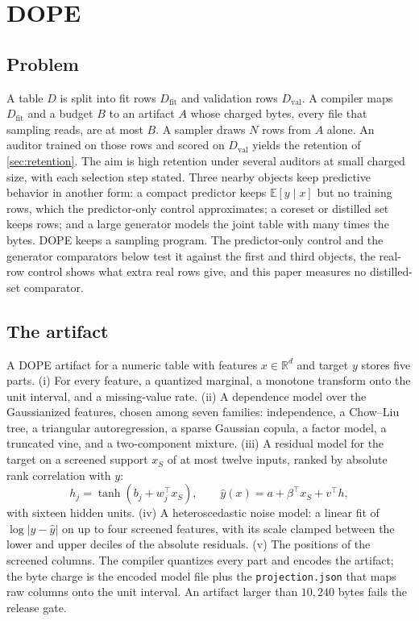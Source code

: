 \documentclass{article} %
\begin{document}
\section{DOPE}
\label{sec:method}
\subsection{Problem}
\label{sec:problem}
A table $D$ is split into fit rows $D_{\mathrm{fit}}$ and validation rows $D_{\mathrm{val}}$. A compiler maps $D_{\mathrm{fit}}$ and a budget $B$ to an artifact $A$ whose charged bytes, every file that sampling reads, are at most $B$. A sampler draws $N$ rows from $A$ alone. An auditor trained on those rows and scored on $D_{\mathrm{val}}$ yields the retention of \cref{sec:retention}. The aim is high retention under several auditors at small charged size, with each selection step stated. Three nearby objects keep predictive behavior in another form: a compact predictor keeps $\mathbb{E}[y\mid x]$ but no training rows, which the predictor-only control approximates; a coreset or distilled set keeps rows; and a large generator models the joint table with many times the bytes. DOPE keeps a sampling program. The predictor-only control and the generator comparators below test it against the first and third objects, the real-row control shows what extra real rows give, and this paper measures no distilled-set comparator.

\subsection{The artifact}
\label{sec:artifact}
A DOPE artifact for a numeric table with features $x\in\mathbb{R}^d$ and target $y$ stores five parts. (i) For every feature, a quantized marginal, a monotone transform onto the unit interval, and a missing-value rate. (ii) A dependence model over the Gaussianized features, chosen among seven families: independence, a Chow--Liu tree, a triangular autoregression, a sparse Gaussian copula, a factor model, a truncated vine, and a two-component mixture. (iii) A residual model for the target on a screened support $x_S$ of at most twelve inputs, ranked by absolute rank correlation with $y$:
\begin{equation}
\label{eq:residual}
h_j = \tanh\!\left(b_j + w_j^{\top} x_S\right),
\qquad
\hat{y}(x) = a + \beta^{\top} x_S + v^{\top} h ,
\end{equation}
with sixteen hidden units. (iv) A heteroscedastic noise model: a linear fit of $\log|y-\hat{y}|$ on up to four screened features, with its scale clamped between the lower and upper deciles of the absolute residuals. (v) The positions of the screened columns. The compiler quantizes every part and encodes the artifact; the byte charge is the encoded model file plus the \texttt{projection.json} that maps raw columns onto the unit interval. An artifact larger than $10{,}240$ bytes fails the release gate.
\end{document}
